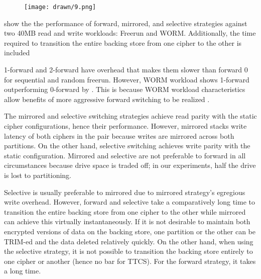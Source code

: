 \begin{figure}[ht]
 \centering
  \texttt{[image: drawn/9.png]}
   \caption{}\label{fig:strategy-vs-strategy}
\end{figure}

 show the the performance of forward, mirrored, and
selective strategies against two 40MB read and write workloads: Freerun and
WORM.  Additionally, the time required to
transition the entire backing store from one cipher to the other is included

1-forward and 2-forward have overhead that makes them slower than forward 0 for
sequential and random freerun. However, WORM workload shows 1-forward
outperforming 0-forward by . This is
because WORM workload characteristics allow benefits of more aggressive forward
switching to be realized .

The mirrored and selective switching strategies achieve read parity with the
static cipher configurations, hence their performance. However, mirrored stacks
write latency of both ciphers in the pair because writes are mirrored across
both partitions. On the other hand, selective switching achieves write parity
with the static configuration. Mirrored and selective are not preferable to
forward in all circumstances because drive space is traded off; in our
experiments, half the drive is lost to partitioning.


Selective is usually preferable to mirrored due to mirrored strategy's egregious
write overhead. However, forward and selective take a comparatively long time to
transition the entire backing store from one cipher to the other while mirrored
can achieve this virtually instantaneously. If it is not desirable to maintain
both encrypted versions of data on the backing store, one partition or the other
can be TRIM-ed and the data deleted relatively quickly. On the other hand, when
using the selective strategy, it is not possible to transition the backing store
entirely to one cipher or another (hence no bar for TTCS). For the forward
strategy, it takes a long time. 
